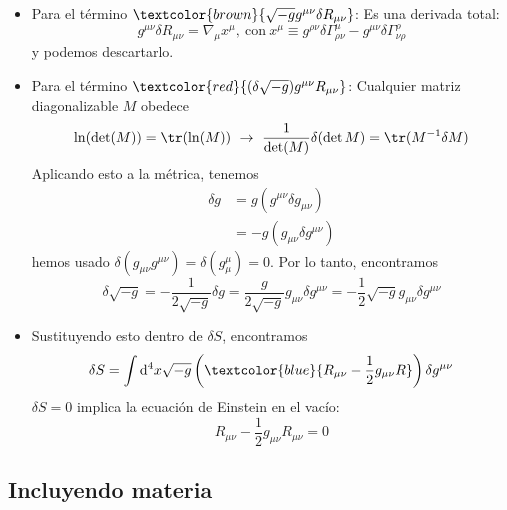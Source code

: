 \documentclass[../main]{subfiles}
\begin{document}
\begin{adjustwidth}{0pt}{-100pt}
\begin{itemize}
    \item Para el término $\textcolor{brown}{\sqrt{-g}g^{\mu\nu}\delta R_{\mu\nu}}$: Es una derivada total:
    \begin{equation}
        g^{\mu\nu}\delta R_{\mu\nu}=\nabla_{\mu}x^{\mu}, \ \text{con} \ x^{\mu} \equiv g^{\rho\nu} \delta \Gamma^{\mu}_{\rho\nu}-g^{\mu\nu}\delta\Gamma^{\rho}_{\nu\rho}
    \end{equation}
    y podemos descartarlo.
    \item Para el término $\textcolor{red}{(\delta \sqrt{-g})g^{\mu\nu}R_{\mu\nu}}$: Cualquier matriz diagonalizable $M$ obedece
    \begin{equation}
        \ln(\det(M))=\tr(\ln(M)) \ \rightarrow \ \dfrac{1}{\det(M)}\delta(\det M)=\tr(M^{-1} \delta M)
    \end{equation}
    Aplicando esto a la métrica, tenemos 
    \begin{equation}
        \begin{split}
            \delta g &= g(g^{\mu\nu}\delta g_{\mu\nu})\\
                     &=-g(g_{\mu\nu}\delta g^{\mu\nu})
        \end{split}
    \end{equation}
    hemos usado $\delta(g_{\mu\nu}g^{\mu\nu})=\delta(g^{\mu}_{\mu})=0$. Por lo tanto, encontramos 
    \begin{equation}
        \delta \sqrt{-g} = -\dfrac{1}{2\sqrt{-g}}\delta g=\dfrac{g}{2\sqrt{-g}}g_{\mu\nu}\delta g^{\mu\nu}=-\dfrac{1}{2}\sqrt{-g}g_{\mu\nu}\delta g^{\mu\nu}
    \end{equation}
    \item Sustituyendo esto dentro de $\delta S$, encontramos 
    \begin{equation}
        \delta S = \int \mathrm{d}^4 x \sqrt{-g}\left(\textcolor{blue}{R_{\mu\nu}-\dfrac{1}{2}g_{\mu\nu}R}\right)\delta g^{\mu\nu}
    \end{equation}
    $\delta S=0$ implica la ecuación de Einstein en el vacío:
    \begin{equation}
        R_{\mu\nu}-\dfrac{1}{2}g_{\mu\nu}R_{\mu\nu}=0
    \end{equation}
\end{itemize}

\subsection{Incluyendo materia}


\end{adjustwidth}
\end{document}
